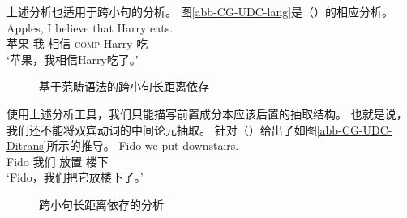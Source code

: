 \noindent
上述分析也适用于跨小句的分析。
图\vref{abb-CG-UDC-lang}是（）的相应分析。
\ea
\gll Apples, I believe that Harry eats.\\
     苹果 我 相信 \textsc{comp} Harry 吃\\
\glt `苹果，我相信Harry吃了。'
\z
\begin{figure}
\centerline{%
}
\caption{\label{abb-CG-UDC-lang}基于范畴语法的跨小句长距离依存}
\end{figure}%
%
使用上述分析工具，我们只能描写前置成分本应该后置的抽取结构。
也就是说，我们还不能将双宾动词的中间论元抽取\citep[]{Steedman85a-u}。
\citet[]{Pollard88a}针对（）给出了如图\vref{abb-CG-UDC-Ditrans}所示的推导。
\ea
\gll Fido we put downstairs. \\
     Fido 我们 放置 楼下 \\
\glt `Fido，我们把它放楼下了。'
\z
\begin{figure}
\centerline{%
}
\caption{\label{abb-CG-UDC-Ditrans}跨小句长距离依存的分析}
\end{figure}%

